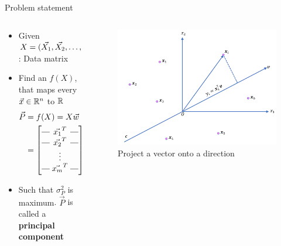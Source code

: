 \begin{frame}{Problem statement}
    \begin{columns}
        \begin{column}{0.7\textwidth}
            \begin{itemize}
                \item Given $X = (\vec{X_1}, \vec{X_2},\dots,\vec{X_n}) \in \mathbb{R}^{m\times n}$: Data matrix
                \item Find an $f(X)$, that maps every $\vec{x} \in \mathbb{R}^n$ to $\mathbb{R}$
                \begin{align*}
                    \vec{P} &= f(X)= X\vec{w}\quad (\vec{w}\in \R^{n})\\
                    &= \brows{
                        \vec{x_1}^T \\
                        \vec{x_2}^T \\
                        \rowsvdots \\
                        \vec{x_m}^T} \vec{w} = \begin{bmatrix}
                            \vec{x_1}^T\vec{w} \\
                            \vec{x_2}^T\vec{w} \\
                            \vdots \\
                            \vec{x_m}^T\vec{w}
                        \end{bmatrix}
                \end{align*}
                \item \alert{Such that $\sigma^2_{P}$ is maximum}. $\vec{P}$ is called a \textbf{principal component}
            \end{itemize}
        \end{column}

        \begin{column}{0.4\textwidth}
            \begin{figure}
                \centering
                \includegraphics[width=\linewidth]{img/pca_variance_intro.png}
                \caption{Project a vector onto a direction}
            \end{figure}
        \end{column}
    \end{columns}
\end{frame}

